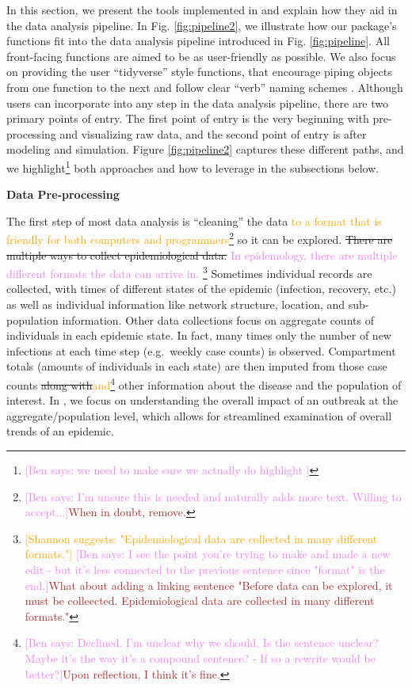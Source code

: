 \documentclass[
  shortnames]{jss}
\begin{document}
In this section, we present the tools implemented in 
and explain how they aid in the data analysis pipeline. In Fig.
\ref{fig:pipeline2}, we illustrate how our package's functions fit into
the data analysis pipeline introduced in Fig. \ref{fig:pipeline}. All
front-facing functions are aimed to be as user-friendly as possible. We
also focus on providing the user ``tidyverse'' style functions, that
encourage piping objects from one function to the next and follow clear
``verb'' naming schemes \citep{Wickham2019}. Although users can
incorporate  into any step in the data analysis
pipeline, there are two primary points of entry. The first point of
entry is the very beginning with pre-processing and visualizing raw
data, and the second point of entry is after modeling and simulation.
Figure \ref{fig:pipeline2} captures these different paths, and we
highlight\footnote{\textcolor{violet}{[Ben says: we need to make sure we actually do highlight ]}}
both approaches and how to leverage  in the subsections
below.

\textbf{Data Pre-processing}

The first step of most data analysis is ``cleaning'' the data
\textcolor{orange}{to a format that is friendly for both computers and programmers}\footnote{\textcolor{violet}{[Ben says: I'm unsure this is needed and naturally adds more text. Willing to accept...]}\textcolor{brown}{When in doubt, remove.}}
so it can be explored.
\sout{There are multiple ways to collect epidemiological data.}
\textcolor{violet}{In epidemology, there are multiple different formats the data can arrive in.}
\footnote{\textcolor{orange}{[Shannon suggests: "Epidemiological data are collected in many different formats."]} \textcolor{violet}{[Ben says: I see the point you're trying to make and made a new edit - but it's less connected to the previous sentence since "format" is the end.]}\textcolor{brown}{What about adding a linking sentence "Before data can be explored, it must be colleected.  Epidemiological data are collected in many different formats."}}
Sometimes individual records are collected, with times of different
states of the epidemic (infection, recovery, etc.) as well as individual
information like network structure, location, and sub-population
information. Other data collections focus on aggregate counts of
individuals in each epidemic state. In fact, many times only the number
of new infections at each time step (e.g.~weekly case counts) is
observed. Compartment totals (amounts of individuals in each state) are
then imputed from those case
counts\sout{ along with}\textcolor{orange}{and}\footnote{\textcolor{violet}{[Ben says: Declined. I'm unclear why we should. Is the sentence unclear? Maybe it's the way it's a compound sentence? - If so a rewrite would be better?]}\textcolor{brown}{Upon reflection, I think it's fine.}}
other information about the disease and the population of interest. In
, we focus on understanding the overall impact of an
outbreak at the aggregate/population level, which allows for streamlined
examination of overall trends of an epidemic.
\end{document}
